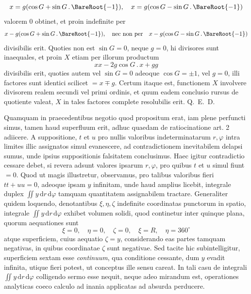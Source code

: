 \[
x=g(\cos G+\sin G\, .\,\BareRoot{-1}),\quad x=g(\cos G-\sin G\, .\,\BareRoot{-1})
\]
valorem 0 obtinet, et proin indefinite per
\[
x-g(\cos G+\sin G\, .\,\BareRoot{-1}),\quad\text{nec non per}\quad x-g(\cos G-\sin G\, .\,\BareRoot{-1})
\]
divisibilis erit. Quoties non est $\sin G=0$, neque $g=0$, hi divisores sunt
inaequales, et proin $X$ etiam per illorum productum
\[
xx-2g\cos G\, .\,x+gg
\]
divisibilis erit, quoties autem vel $\sin G=0$ adeoque $\cos G=\pm1$, vel $g=0$,
illi factores sunt identici scilicet $=x\mp g$. Certum itaque est, functionem $X$
involvere divisorem realem secundi vel primi ordinis, et quum eadem conclusio
rursus de quotiente valeat, $X$ in tales factores complete resolubilis erit. Q.~E.~D.

Quamquam in praecedentibus negotio quod propositum erat, iam plene perfuncti simus, tamen haud superfluum erit, adhuc quaedam de ratiocinatione art. 2
adiicere. A suppositione, $t$ et $u$ pro nullis valoribus indeterminatarum $r,\varphi$ intra limites illic assignatos simul evanescere, ad contradictionem inevitabilem delapsi sumus, unde ipsius suppositionis falsitatem conclusimus. Haec igitur contradictio cessare debet, si revera adsunt valores ipsarum $r,\varphi$, pro quibus $t$ et $u$
simul fiunt $=0$. Quod ut magis illustretur, observamus, pro talibus valoribus
fieri $tt+uu=0$, adeoque ipsam $y$ infinitam, unde haud amplius licebit, integrale duplex $\iint y\,\mathrm dr\,\mathrm d\varphi$ tamquam quantitatem assignabilem tractare. Generaliter quidem loquendo, denotantibus $\xi,\eta,\zeta$ indefinite coordinatas punctorum in
spatio, integrale $\iint y\,\mathrm dr\,\mathrm d\varphi$ exhibet volumen solidi, quod continetur inter quinque plana, quorum aequationes sunt
\[
\xi=0,\quad\eta=0,\quad\zeta=0,\quad\xi=R,\quad\eta=360^\circ
\]
atque superficiem, cuius aequatio $\zeta=y$, considerando eas partes tamquam negativas, in quibus coordinatae $\zeta$ sunt negativae. Sed tacite hic subintelligitur,
superficiem sextam esse \textit{continuum}, qua conditione cessante, dum $y$ evadit infinita, utique fieri potest, ut conceptus ille sensu careat. In tali casu de integrali
$\iint y\,\mathrm dr\,\mathrm d\varphi$ colligendo sermo esse nequit, neque adeo mirandum est, operationes
analyticas coeco calculo ad inania applicatas ad absurda perducere.

